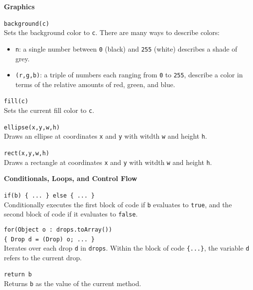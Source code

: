 \documentclass[10pt,twocolumn]{article}
\begin{document}
\noindent\textbf{Graphics}
\begin{description}
\item{\texttt{background(c)}}\ \\[.25em]
%
Sets the background color to \texttt{c}. There are many ways to describe colors: 
\begin{itemize}
\item \texttt{n}: a single number between \texttt{0} (black) and \texttt{255} (white) describes a shade of grey. 
\item \texttt{(r,g,b)}: a triple of numbers each ranging from
  \texttt{0} to \texttt{255}, describe a color in terms of the
  relative amounts of red, green, and blue.
\end{itemize}

\item{\texttt{fill(c)}}\ \\[.25em]
Sets the current fill color to \texttt{c}. 

\item{\texttt{ellipse(x,y,w,h)}}\ \\[.25em]
Draws an ellipse at coordinates \texttt{x} and \texttt{y} with witdth \texttt{w} and height \texttt{h}. 

\item{\texttt{rect(x,y,w,h)}}\ \\[.25em]
Draws a rectangle at coordinates \texttt{x} and \texttt{y} with witdth \texttt{w} and height \texttt{h}. 
\end{description}

\bigskip

\noindent\textbf{\large Conditionals, Loops, and Control Flow}
\begin{description}

\item{\texttt{if(b) \{ ... \} else \{ ... \}}}\ \\[.25em] 
% 
Conditionally executes the first block of code if \texttt{b} evaluates to
\texttt{true}, and the second block of code if it evaluates to \texttt{false}.

\item{\texttt{for(Object o : drops.toArray()) \\ \{ Drop d = (Drop) o; ... \}}} \ \\[.25em]
%
  Iterates over each drop \texttt{d} in \texttt{drops}. Within
  the block of code \texttt{\{...\}}, the variable
  \texttt{d} refers to the current drop.

\item{\texttt{return b}} \ \\[.25em]
%
  Returns \texttt{b} as the value of the current method.
\end{description}
\end{document}
